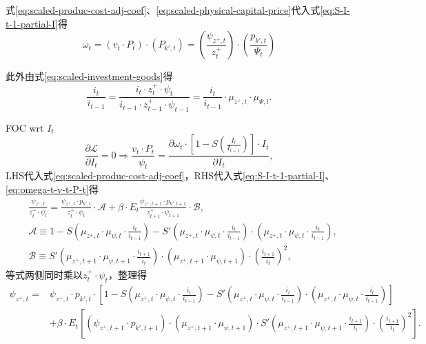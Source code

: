 式\eqref{eq:scaled-produc-cost-adj-coef}、\eqref{eq:scaled-physical-capital-price}代入式\eqref{eq:S-I-t-1-partial-I}得
\begin{equation}
\label{eq:omega-t-v-t-P-t}
\omega_t = \left(v_t \cdot P_t \right) \cdot \left(P_{k',t}\right) = \left(\frac{\psi_{z^+,t}}{z^+_t}\right) \cdot \left(\frac{p_{k',t}}{\Psi_t}\right)
\end{equation}

此外由式\eqref{eq:scaled-investment-goods}得
\begin{equation}
\label{eq:I-t-1-i-t-i}
\frac{i_t}{i_{t-1}} = \frac{
  i_t \cdot z^+_t \cdot \psi_t
}{
  i_{t-1} \cdot z^+_{t-1} \cdot \psi_{t-1}
}
=\frac{i_t}{i_{t-1}} \cdot \mu_{z^+,t} \cdot \mu_{\Psi,t}.
\end{equation}

FOC wrt $I_t$
\begin{equation}
\label{eq:eq:HH-max-FOC-I-intm}
\frac{\partial \mathcal{L}}{\partial I_t} = 0 \Rightarrow \frac{v_t \cdot P_t}{\psi_t} =\frac{\partial \omega_t \cdot \left[1-S \left(\frac{I_t}{I_{t-1}}\right)\right] \cdot I_t}{\partial I_t},
\end{equation}
LHS代入式\eqref{eq:scaled-produc-cost-adj-coef}，RHS代入式\eqref{eq:S-I-t-1-partial-I}、\eqref{eq:omega-t-v-t-P-t}得
\begin{equation}
\begin{split}
&\frac{\psi_{z^+,t}}{z^+_t \cdot \psi_t} = \frac{\psi_{z^+,t} \cdot p_{k',t}}{z^+_t \cdot \psi_t} \cdot \mathcal{A} + \beta \cdot E_t \frac{\psi_{z^+,t+1} \cdot p_{k',t+1}}{z^+_{t+1} \cdot \psi_{t+1}} \cdot \mathcal{B},\\
& \mathcal{A} \equiv 1-S\left(
\mu_{z^+,{t}} \cdot \mu_{\psi,t} \cdot \frac{i_{t}}{i_{t-1}}
\right)
-S'\left(
\mu_{z^+,{t}} \cdot \mu_{\psi,t} \cdot \frac{i_{t}}{i_{t-1}}
\right) \cdot
\left(
\mu_{z^+,{t}} \cdot \mu_{\psi,t} \cdot \frac{i_{t}}{i_{t-1}}
\right), \\
& \mathcal{B} \equiv S'\left(
\mu_{z^+,{t+1}} \cdot \mu_{\psi,t+1} \cdot \frac{i_{t+1}}{i_{t}}
\right) \cdot
\left(
\mu_{z^+,{t+1}} \cdot \mu_{\psi,t+1} \right)
\cdot \left(
  \frac{i_{t+1}}{i_{t}}
\right)^2,
\end{split}
\end{equation}
等式两侧同时乘以$z^+_t \cdot \psi_t$，整理得
\begin{equation}
\label{eq:HH-max-FOC-I}
\begin{split}
\psi_{z^+,t} = &\psi_{z^+,t} \cdot p_{k',t} \cdot \left[
1-S\left(
\mu_{z^+,{t}} \cdot \mu_{\psi,t} \cdot \frac{i_{t}}{i_{t-1}}
\right)
-S'\left(
\mu_{z^+,{t}} \cdot \mu_{\psi,t} \cdot \frac{i_{t}}{i_{t-1}}
\right) \cdot
\left(
\mu_{z^+,{t}} \cdot \mu_{\psi,t} \cdot \frac{i_{t}}{i_{t-1}}
\right)
\right] \\
&+ \beta \cdot E_t \left[
\left(\psi_{z^+,t+1} \cdot p_{k',t+1} \right) \cdot
\left(
\mu_{z^+,{t+1}} \cdot \mu_{\psi,t+1} \right)
\cdot
S'\left(
\mu_{z^+,{t+1}} \cdot \mu_{\psi,t+1} \cdot \frac{i_{t+1}}{i_{t}}
\right) \cdot
\left(
  \frac{i_{t+1}}{i_{t}}
\right)^2
\right].
\end{split}
\end{equation}

